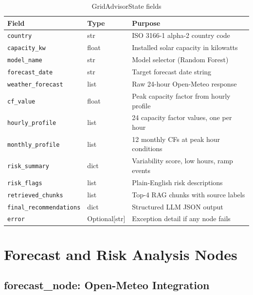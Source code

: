 \documentclass[12pt, a4paper]{article}
\begin{document}
\begin{table}[H]
    \centering
    \caption{GridAdvisorState fields}
    \label{tab:state}
    \begin{tabularx}{\textwidth}{llX}
        \toprule
        \textbf{Field} & \textbf{Type} & \textbf{Purpose} \\
        \midrule
        \texttt{country} & str & ISO 3166-1 alpha-2 country code \\
        \texttt{capacity\_kw} & float & Installed solar capacity in kilowatts \\
        \texttt{model\_name} & str & Model selector (Random Forest) \\
        \texttt{forecast\_date} & str & Target forecast date string \\
        \texttt{weather\_forecast} & list & Raw 24-hour Open-Meteo response \\
        \texttt{cf\_value} & float & Peak capacity factor from hourly profile \\
        \texttt{hourly\_profile} & list & 24 capacity factor values, one per hour \\
        \texttt{monthly\_profile} & list & 12 monthly CFs at peak hour conditions \\
        \texttt{risk\_summary} & dict & Variability score, low hours, ramp events \\
        \texttt{risk\_flags} & list & Plain-English risk descriptions \\
        \texttt{retrieved\_chunks} & list & Top-4 RAG chunks with source labels \\
        \texttt{final\_recommendations} & dict & Structured LLM JSON output \\
        \texttt{error} & Optional[str] & Exception detail if any node fails \\
        \bottomrule
    \end{tabularx}
\end{table}

\newpage
\section{Forecast and Risk Analysis Nodes}
\label{sec:forecastrisk}

\subsection{forecast\_node: Open-Meteo Integration}
\end{document}
